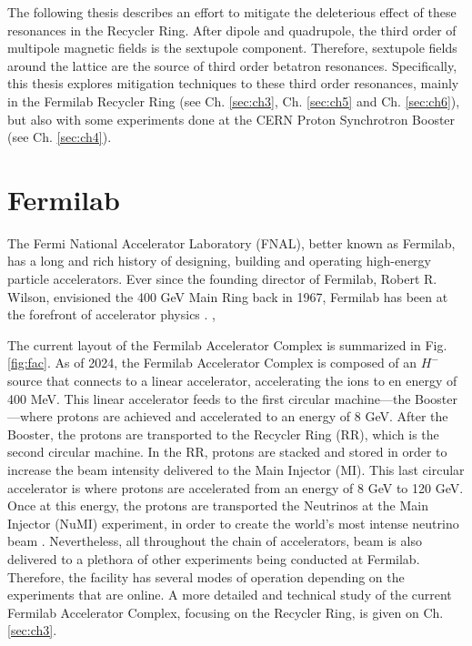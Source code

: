 The following thesis describes an effort to mitigate the deleterious effect of these resonances in the Recycler Ring. After dipole and quadrupole, the third order of multipole magnetic fields is the sextupole component. Therefore, sextupole fields around the lattice are the source of third order betatron resonances. Specifically, this thesis explores mitigation techniques to these third order resonances, mainly in the Fermilab Recycler Ring (see Ch. \ref{sec:ch3}, Ch. \ref{sec:ch5} and Ch. \ref{sec:ch6}), but also with some experiments done at the CERN Proton Synchrotron Booster (see Ch. \ref{sec:ch4}). 

\section{Fermilab}

The Fermi National Accelerator Laboratory (FNAL), better known as Fermilab, has a long and rich history of designing, building and operating high-energy particle accelerators. Ever since the founding director of Fermilab, Robert R. Wilson, envisioned the 400 GeV Main Ring back in 1967, Fermilab has been at the forefront of accelerator physics \cite{tevatron}.     ,\cite{fermilab1}

The current layout of the Fermilab Accelerator Complex is summarized in Fig. \ref{fig:fac}. As of 2024, the Fermilab Accelerator Complex is composed of an $H^-$ source that connects to a linear accelerator, accelerating the ions to en energy of 400 MeV. This linear accelerator feeds to the first circular machine---the Booster---where protons are achieved and accelerated to an energy of 8 GeV. After the Booster, the protons are transported to the Recycler Ring (RR), which is the second circular machine. In the RR, protons are stacked and stored in order to increase the beam intensity delivered to the Main Injector (MI). This last circular accelerator is where protons are accelerated from an energy of 8 GeV to 120 GeV. Once at this energy, the protons are transported the Neutrinos at the Main Injector (NuMI) experiment, in order to create the world's most intense neutrino beam \cite{numi1}. Nevertheless, all throughout the chain of accelerators, beam is also delivered to a plethora of other experiments being conducted at Fermilab. Therefore, the facility has several modes of operation depending on the experiments that are online. A more detailed and technical study of the current Fermilab Accelerator Complex, focusing on the Recycler Ring, is given on Ch. \ref{sec:ch3}.   

